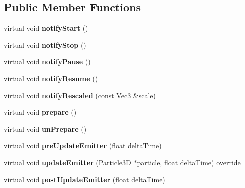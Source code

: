 \subsection*{Public Member Functions}
\begin{DoxyCompactItemize}
\item 
\mbox{\label{classPUEmitter_a2deba8aab71429d17a97b20cc5f9e632}} 
virtual void {\bfseries notify\+Start} ()
\item 
\mbox{\label{classPUEmitter_ae19f9267967dbdc7b07dd2fbc3fbd999}} 
virtual void {\bfseries notify\+Stop} ()
\item 
\mbox{\label{classPUEmitter_a2a0fc62b44e94bc8b67c390988abcdf5}} 
virtual void {\bfseries notify\+Pause} ()
\item 
\mbox{\label{classPUEmitter_ad3eeee26d8830ddbdef5688c2a67a482}} 
virtual void {\bfseries notify\+Resume} ()
\item 
\mbox{\label{classPUEmitter_af61e32b075035f5b23301bf286de7793}} 
virtual void {\bfseries notify\+Rescaled} (const \hyperlink{classVec3}{Vec3} \&scale)
\item 
\mbox{\label{classPUEmitter_a2c3220d38c2f1a7719b24e89f0638c15}} 
virtual void {\bfseries prepare} ()
\item 
\mbox{\label{classPUEmitter_a9b90702100c8305503e547f52fe9e647}} 
virtual void {\bfseries un\+Prepare} ()
\item 
\mbox{\label{classPUEmitter_a4a293af23dbe77244afacb1800f739b0}} 
virtual void {\bfseries pre\+Update\+Emitter} (float delta\+Time)
\item 
\mbox{\label{classPUEmitter_a85e1f8bf3cb3b1f1a4bb01603198fd81}} 
virtual void {\bfseries update\+Emitter} (\hyperlink{structParticle3D}{Particle3D} $\ast$particle, float delta\+Time) override
\item 
\mbox{\label{classPUEmitter_af7c5ec1487e58fa89669663a0b75c8ca}} 
virtual void {\bfseries post\+Update\+Emitter} (float delta\+Time)
\item 

\end{DoxyCompactItemize}
